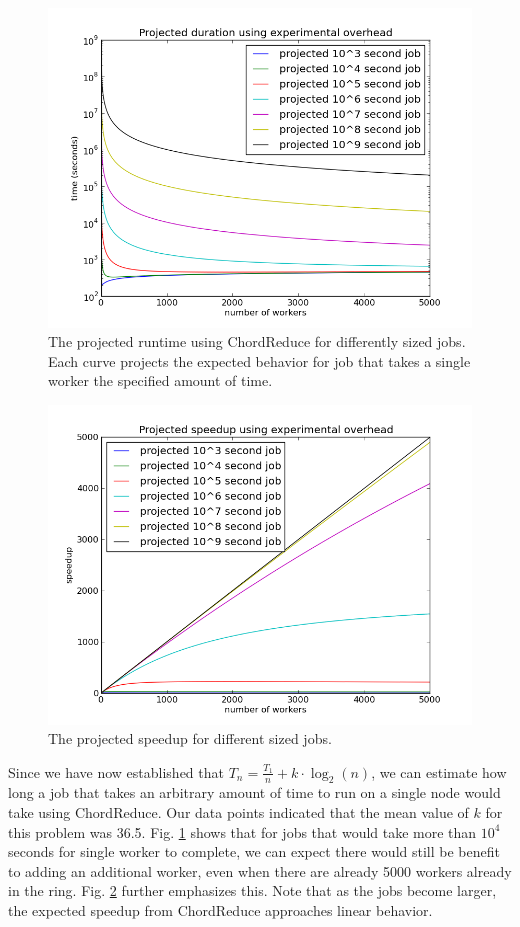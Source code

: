 \documentclass[10pt, conference, compsocconf]{IEEEtran}
\begin{document}
\begin{figure}
    \includegraphics[width=\linewidth]{projTime}
    \caption{The projected runtime using ChordReduce for differently sized jobs.  Each curve projects the expected behavior for job that takes a single worker the specified amount of time.}
    \label{projTime}
\end{figure}

\begin{figure}
    \includegraphics[width=\linewidth]{projSpeed}
    \caption{The projected speedup for different sized jobs. }
    \label{projSpeed}
\end{figure}

Since we have now established that $T_{n} = \frac{T_{1}}{n} + k \cdot \log_{2}(n)$, we can estimate how long a job that takes an arbitrary amount of time to run on a single node would take using ChordReduce.  Our data points indicated that the mean value of $k$ for this problem was 36.5.  Fig. \ref{projTime} shows that for jobs that would take more than $10^{4}$ seconds for single worker to complete, we can expect there would still be benefit to adding an additional worker, even when there are already 5000 workers already in the ring.  Fig. \ref{projSpeed} further emphasizes this. Note that as the jobs become larger, the expected speedup from ChordReduce  approaches linear behavior.
\end{document}
